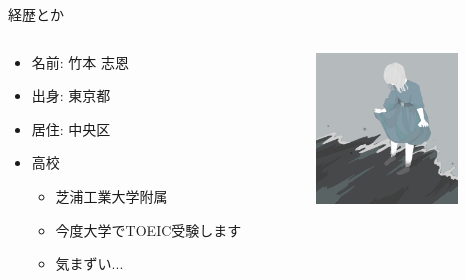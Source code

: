 \documentclass[unicode,12pt,aspectratio=169, dvipdfmx]{beamer}
\begin{document}
    \begin{frame}{経歴とか}
        \begin{columns}
            \begin{column}{.5\linewidth}
                \begin{itemize}
                    \item 名前: 竹本 志恩
                    \item 出身: 東京都
                    \item 居住: 中央区
                    \item 高校
                    \begin{itemize}
                        \item 芝浦工業大学附属
                        \item 今度大学でTOEIC受験します
                        \item 気まずい...
                    \end{itemize}
                \end{itemize}          
            \end{column}
            \begin{column}{.4\linewidth}
                \begin{center}
                    \includegraphics[height=40mm, width=40mm]{figures/444.jpeg}
                \end{center}
            \end{column}
        \end{columns}
    \end{frame}
\end{document}
